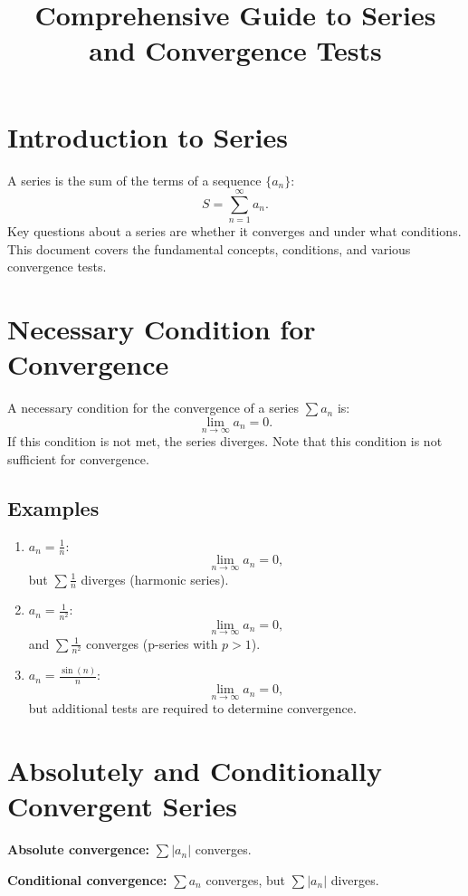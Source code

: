 \documentclass[a4paper, 12pt]{article}
\title{Comprehensive Guide to Series and Convergence Tests}
\author{}
\date{}
\begin{document}
\maketitle

\section*{Introduction to Series}
A series is the sum of the terms of a sequence \( \{a_n\} \):
\[
S = \sum_{n=1}^\infty a_n.
\]
Key questions about a series are whether it converges and under what conditions. This document covers the fundamental concepts, conditions, and various convergence tests.

\section{Necessary Condition for Convergence}
A necessary condition for the convergence of a series \(\sum a_n\) is:
\[
\lim_{n \to \infty} a_n = 0.
\]
If this condition is not met, the series diverges. Note that this condition is not sufficient for convergence.

\subsection*{Examples}
\begin{enumerate}
    \item \(a_n = \frac{1}{n}\):
    \[\lim_{n \to \infty} a_n = 0,\]
    but \(\sum \frac{1}{n}\) diverges (harmonic series).
    
    \item \(a_n = \frac{1}{n^2}\):
    \[\lim_{n \to \infty} a_n = 0,\]
    and \(\sum \frac{1}{n^2}\) converges (p-series with \(p > 1\)).

    \item \(a_n = \frac{\sin(n)}{n}\):
    \[\lim_{n \to \infty} a_n = 0,\]
    but additional tests are required to determine convergence.
\end{enumerate}

\pagebreak

\section{Absolutely and Conditionally Convergent Series}
\textbf{Absolute convergence:} \(\sum |a_n|\) converges.

\textbf{Conditional convergence:} \(\sum a_n\) converges, but \(\sum |a_n|\) diverges.
\end{document}
